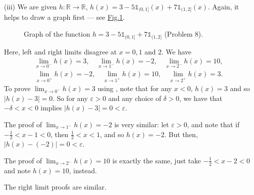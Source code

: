 \documentclass[letterpaper,10pt,english]{jupyterBook}
\let\sphinxpxdimen\pdfpxdimen\else\newdimen\sphinxpxdimen
\begin{document}
\sphinxAtStartPar
(iii) We are given \(h:\mathbb{R}\to\mathbb{R}\), \(h(x) =3 - 5\mathbb{1}_{(0, 1]}(x) + 7\mathbb{1}_{(1, 2]}(x)\). Again, it helps to draw a graph first — see \hyperref[\detokenize{Solutions-full:iii}]{Fig.\@ \ref{\detokenize{Solutions-full:iii}}}.

\begin{figure}[htbp]
\centering
\capstart

\noindent\sphinxincludegraphics[width=500\sphinxpxdimen]{{8iii}.png}
\caption{Graph of the function \(h=3 - 5\mathbb{1}_{(0, 1]} + 7\mathbb{1}_{(1, 2]}\) (Problem 8).}\label{\detokenize{Solutions-full:iii}}\end{figure}

\sphinxAtStartPar
Here, left and right limits disagree at \(x = 0, 1\) and \(2\). We have
\begin{equation*}
\begin{split}
\lim_{x \rightarrow 0^-}h(x) = 3, \hspace{1em} \lim_{x \rightarrow 1^-}h(x) = -2, \hspace{1em}  \lim_{x \rightarrow 2^-}h(x) = 10,
\end{split}
\end{equation*}\begin{equation*}
\begin{split}
\lim_{x \rightarrow 0^+}h(x) = -2, \hspace{1em} \lim_{x \rightarrow 1^+}h(x) = 10, \hspace{1em}  \lim_{x \rightarrow 2^+}h(x) = 3.
\end{split}
\end{equation*}
\sphinxAtStartPar
To prove \(\lim_{x \rightarrow 0^-}h(x) = 3\) using , note that for any \(x<0\), \(h(x)=3\) and so \(|h(x)-3|=0\). So for any \(\varepsilon>0\) and any choice of \(\delta>0\), we have that \(-\delta<x<0\) implies \(|h(x)-3|=0<\varepsilon\).

\sphinxAtStartPar
The proof of \(\lim_{x \rightarrow 1^-}h(x) = -2\) is very similar: let \(\varepsilon>0\), and note that if \(-\frac{1}{2}<x-1<0\), then \(\frac{1}{2}<x<1\), and so \(h(x)=-2\). But then, \(|h(x)-(-2)|=0<\varepsilon\).

\sphinxAtStartPar
The proof of \(\lim_{x \rightarrow 2^-}h(x) = 10\) is exactly the same, just take \(-\frac{1}{2}<x-2<0\) and note \(h(x)=10\), instead.

\sphinxAtStartPar
The right limit proofs are similar.
\end{document}

